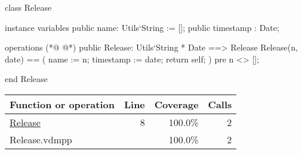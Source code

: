 \begin{vdmpp}[breaklines=true]
class Release

 instance variables
  public name: Utils`String := [];
  public timestamp : Date;
 
 operations
(*@
\label{Release:8}
@*)
  public Release: Utils`String * Date ==> Release
  Release(n, date) == (
   name := n;
   timestamp := date;
   return self;
  )
  pre n <> [];
  
end Release
\end{vdmpp}
\bigskip
\begin{longtable}{|l|r|r|r|}
\hline
Function or operation & Line & Coverage & Calls \\
\hline
\hline
\hyperref[Release:8]{Release} & 8&100.0\% & 2 \\
\hline
\hline
Release.vdmpp & & 100.0\% & 2 \\
\hline
\end{longtable}

